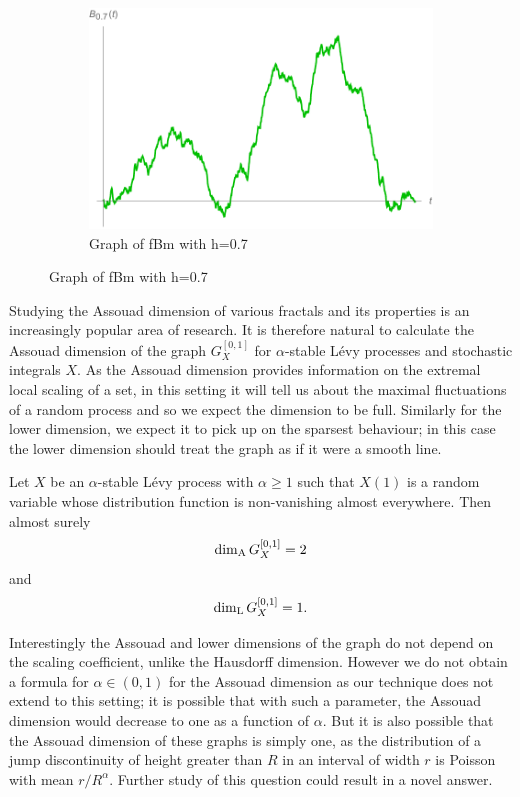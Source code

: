 \begin{figure}[h]
\begin{subfigure}[b]{0.3\textwidth}
		\includegraphics[width=\textwidth]{pics/ch-brownian/fbm0_7.pdf}
		\caption{Graph of fBm with h=0.7}
		\label{fig:fbm7}
	\end{subfigure}
\end{figure}


Studying the Assouad dimension of various fractals and its properties is an increasingly popular area of research. It is therefore natural to calculate the Assouad dimension of the graph $G_X^{[0,1]}$ for $\alpha$-stable L\'{e}vy processes and stochastic integrals $X$. As the Assouad dimension provides information on the extremal local scaling of a set, in this setting it will tell us about the maximal fluctuations of a random process and so we expect the dimension to be full. Similarly for the lower dimension, we expect it to pick up on the sparsest behaviour; in this case the lower dimension should treat the graph as if it were a smooth line.


\begin{theorem}\label{Main}
	Let $X$ be an $\alpha$-stable L\'evy process with $\alpha \geq 1$ such that $X(1)$ is a random variable whose distribution function is non-vanishing almost everywhere. Then almost surely
	\[
	\dim_{\textup{A}} G_{X}^{[0,1]} = 2
	\]
	and 
	\[ 
	\dim_{\textup{L}} G_{X}^{[0,1]} = 1.
	\]
\end{theorem}

Interestingly the Assouad and lower dimensions of the graph do not depend on the scaling coefficient, unlike the Hausdorff dimension. However we do not obtain a formula for $\alpha \in (0,1)$ for the Assouad dimension as our technique does not extend to this setting; it is possible that with such a parameter, the Assouad dimension would decrease to one as a function of $\alpha$. But it is also possible that the Assouad dimension of these graphs is simply one, as the distribution of a jump discontinuity of height greater than $R$ in an interval of width $r$ is Poisson with mean $r/R^\alpha$. Further study of this question could result in a novel answer.

